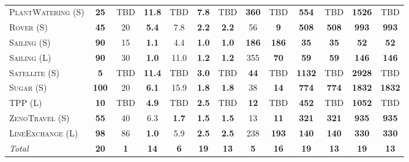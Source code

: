 \documentclass[11pt,landscape]{article}
\begin{document}
\begin{table*}[tb]
{\begin{tabular}{|l||cc||cc||cc||cc||cc||cc||}
\textsc{PlantWatering} (S)&\textbf{25}&TBD&\textbf{11.8}&TBD&\textbf{7.8}&TBD&\textbf{360}&TBD&\textbf{554}&TBD&\textbf{1526}&TBD\\
\textsc{Rover} (S)&\textbf{45}&20&\textbf{5.4}&7.8&\textbf{2.2}&\textbf{2.2}&56&\textbf{9}&\textbf{508}&\textbf{508}&\textbf{993}&\textbf{993}\\
\textsc{Sailing} (S)&\textbf{90}&15&\textbf{1.1}&4.4&\textbf{1.0}&\textbf{1.0}&\textbf{186}&\textbf{186}&\textbf{35}&\textbf{35}&\textbf{52}&\textbf{52}\\
\textsc{Sailing} (L)&\textbf{90}&30&\textbf{1.0}&11.0&\textbf{1.2}&\textbf{1.2}&355&\textbf{70}&\textbf{59}&\textbf{59}&\textbf{146}&\textbf{146}\\
\textsc{Satellite} (S)&\textbf{5}&TBD&\textbf{11.4}&TBD&\textbf{3.0}&TBD&\textbf{44}&TBD&\textbf{1132}&TBD&\textbf{2928}&TBD\\
\textsc{Sugar} (S)&\textbf{100}&20&\textbf{6.1}&15.9&\textbf{1.8}&\textbf{1.8}&38&\textbf{14}&\textbf{774}&\textbf{774}&\textbf{1832}&\textbf{1832}\\
\textsc{TPP} (L)&\textbf{10}&TBD&\textbf{4.9}&TBD&\textbf{2.5}&TBD&\textbf{12}&TBD&\textbf{452}&TBD&\textbf{1052}&TBD\\
\textsc{ZenoTravel} (S)&\textbf{55}&40&6.3&\textbf{1.7}&\textbf{1.5}&\textbf{1.5}&13&\textbf{11}&\textbf{321}&\textbf{321}&\textbf{935}&\textbf{935}\\
\textsc{LineExchange} (L)&\textbf{98}&86&\textbf{1.0}&5.9&\textbf{2.5}&\textbf{2.5}&238&\textbf{193}&\textbf{140}&\textbf{140}&\textbf{330}&\textbf{330}
\\\hline
\textit{Total}&\textbf{20}&\textbf{1}&\textbf{14}&\textbf{6}&\textbf{19}&\textbf{13}&\textbf{5}&\textbf{16}&\textbf{19}&\textbf{13}&\textbf{19}&\textbf{13}\\\hline

        \end{tabular}}
        \caption{}
        \label{tab:experiments}
        \end{table*}
        
\end{document}
